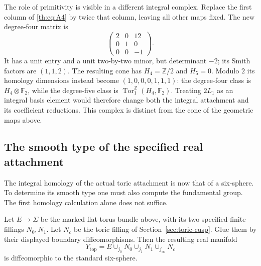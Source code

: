 The role of primitivity is visible in a different integral complex.
Replace the first column of \eqref{th:eq:A4} by twice that column,
leaving all other maps fixed. The new degree-four matrix is
\[
 \begin{pmatrix}2&0&12\\0&1&0\\0&0&-1\end{pmatrix}.
\]
It has a unit entry and a unit two-by-two minor, but determinant $-2$;
its Smith factors are $(1,1,2)$.
The resulting cone has $H_4=\mathbb Z/2$ and $H_5=0$.
Modulo $2$ its homology dimensions instead become
$(1,0,0,0,1,1,1)$: the degree-four class is
$H_4\otimes\mathbb F_2$, while the degree-five class is
$\operatorname{Tor}_1^{\mathbb Z}(H_4,\mathbb F_2)$.
Treating $2L_1$ as an integral basis element would therefore change
both the integral attachment and its coefficient reductions.
This complex is distinct from the cone of the geometric maps above.

\subsection{The smooth type of the specified real attachment}

The integral homology of the actual toric attachment is now that of a
six-sphere. To determine its smooth type one must also compute the
fundamental group. The first homology calculation alone does not suffice.

\begin{theorem}\label{th:thm:real-sphere}
Let $E\to\Sigma$ be the marked flat torus bundle above, with its two
specified finite fillings $N_0,N_1$.
Let $N_c$ be the toric filling of Section~\ref{sec:toric-cusp}. Glue them by their
displayed boundary diffeomorphisms. Then the resulting real manifold
\[
 Y_{\mathrm{top}}=E\cup_{j_0}N_0\cup_{j_1}N_1\cup_{j_\infty}N_c
\]
is diffeomorphic to the standard six-sphere.
\end{theorem}

